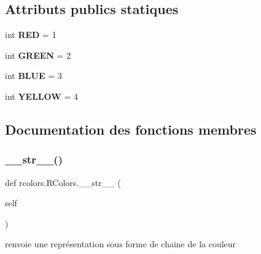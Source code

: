 \subsection*{Attributs publics statiques}
\begin{DoxyCompactItemize}
\item 
\mbox{\label{classrcolors_1_1RColors_a9ec86ff4d44cd118db70f93acf332939}} 
int {\bfseries R\+ED} = 1
\item 
\mbox{\label{classrcolors_1_1RColors_a46f9f9493294a3e212d1b1d6a9381544}} 
int {\bfseries G\+R\+E\+EN} = 2
\item 
\mbox{\label{classrcolors_1_1RColors_af2153d6d9875761b8f0ee0726d514cfb}} 
int {\bfseries B\+L\+UE} = 3
\item 
\mbox{\label{classrcolors_1_1RColors_ae00773aea9e54ddca78695010ec40b67}} 
int {\bfseries Y\+E\+L\+L\+OW} = 4
\end{DoxyCompactItemize}


\subsection{Documentation des fonctions membres}
\mbox{\label{classrcolors_1_1RColors_ab8014c6c1a797ab32c7aa78633efb708}} 
\subsubsection{\texorpdfstring{\+\_\+\+\_\+str\+\_\+\+\_\+()}{\_\_str\_\_()}}
{\footnotesize\ttfamily def rcolors.\+R\+Colors.\+\_\+\+\_\+str\+\_\+\+\_\+ (\begin{DoxyParamCaption}\item[{}]{self }\end{DoxyParamCaption})}

\begin{DoxyVerb}renvoie une représentation sous forme de chaine de la couleur\end{DoxyVerb}
 \mbox{\label{classrcolors_1_1RColors_a05522a9a34974e215921dc130cba1ded}} 
